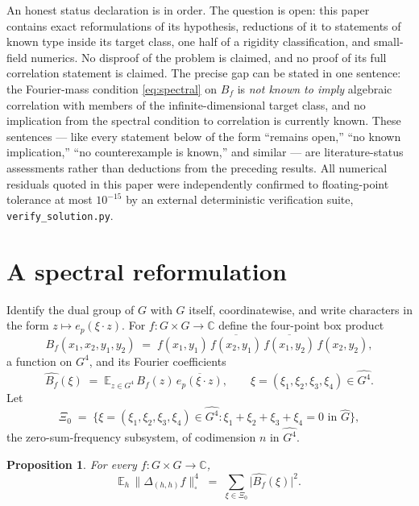 \documentclass[11pt]{article}
\newtheorem{proposition}{Proposition}
\theoremstyle{remark}
\begin{document}
An honest status declaration is in order. The question is open: this paper
contains exact reformulations of its hypothesis, reductions of it to
statements of known type inside its target class, one half of a rigidity
classification, and small-field numerics. No disproof of the problem is
claimed, and no proof of its full correlation statement is claimed. The
precise gap can be stated in one sentence: the Fourier-mass condition
\eqref{eq:spectral} on $B_f$ is \emph{not known to imply} algebraic
correlation with members of the infinite-dimensional target class, and no
implication from the spectral condition to correlation is currently known.
These sentences — like every statement below of the form ``remains open,''
``no known implication,'' ``no counterexample is known,'' and similar — are
literature-status assessments rather than deductions from the preceding
results.
All numerical residuals quoted in this paper were independently confirmed to
floating-point tolerance at most $10^{-15}$ by an external deterministic
verification suite, \texttt{verify\_solution.py}.

\section{A spectral reformulation}\label{sec:spectral}

Identify the dual group of $G$ with $G$ itself, coordinatewise, and write
characters in the form $z\mapsto e_p(\xi\cdot z)$. For
$f:G\times G\to\mathbb{C}$ define the four-point box product
\begin{equation}\label{eq:boxproduct}
B_f(x_1,x_2,y_1,y_2)\;=\;
f(x_1,y_1)\,\overline{f(x_2,y_1)}\,\overline{f(x_1,y_2)}\,f(x_2,y_2),
\end{equation}
a function on $G^4$, and its Fourier coefficients
\begin{equation}\label{eq:fouriercoef}
\widehat{B_f}(\xi)\;=\;\mathbb{E}_{z\in G^4}\,
B_f(z)\,\overline{e_p(\xi\cdot z)},
\qquad \xi=(\xi_1,\xi_2,\xi_3,\xi_4)\in \widehat{G^4}.
\end{equation}
Let
\begin{equation}\label{eq:Xi0}
\Xi_0 \;=\; \bigl\{\xi=(\xi_1,\xi_2,\xi_3,\xi_4)\in\widehat{G^4} :
\xi_1+\xi_2+\xi_3+\xi_4=0 \text{ in } \widehat{G}\bigr\},
\end{equation}
the zero-sum-frequency subsystem, of codimension $n$ in $\widehat{G^4}$.

\begin{proposition}\label{prop:A}
For every $f:G\times G\to\mathbb{C}$,
\begin{equation}\label{eq:spectral}
\mathbb{E}_h\,\bigl\|\Delta_{(h,h)}f\bigr\|_\square^4
\;=\;
\sum_{\xi\in\Xi_0}\bigl|\widehat{B_f}(\xi)\bigr|^2 .
\end{equation}
\end{proposition}
\end{document}
